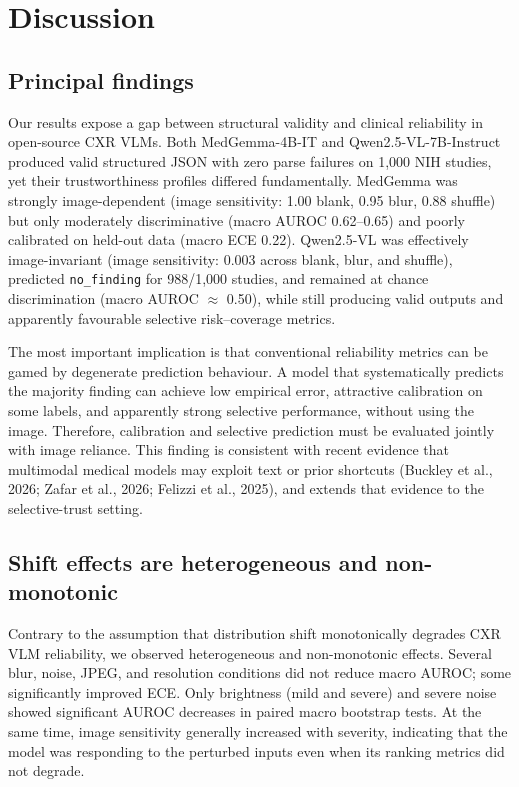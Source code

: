 \section{Discussion}

\subsection{Principal findings}

Our results expose a gap between structural validity and clinical reliability in open-source CXR VLMs. Both MedGemma-4B-IT and Qwen2.5-VL-7B-Instruct produced valid structured JSON with zero parse failures on 1,000 NIH studies, yet their trustworthiness profiles differed fundamentally. MedGemma was strongly image-dependent (image sensitivity: 1.00 blank, 0.95 blur, 0.88 shuffle) but only moderately discriminative (macro AUROC 0.62--0.65) and poorly calibrated on held-out data (macro ECE 0.22). Qwen2.5-VL was effectively image-invariant (image sensitivity: 0.003 across blank, blur, and shuffle), predicted \texttt{no\_finding} for 988/1,000 studies, and remained at chance discrimination (macro AUROC $\approx$ 0.50), while still producing valid outputs and apparently favourable selective risk--coverage metrics.

The most important implication is that conventional reliability metrics can be gamed by degenerate prediction behaviour. A model that systematically predicts the majority finding can achieve low empirical error, attractive calibration on some labels, and apparently strong selective performance, without using the image. Therefore, calibration and selective prediction must be evaluated jointly with image reliance. This finding is consistent with recent evidence that multimodal medical models may exploit text or prior shortcuts (Buckley et al., 2026; Zafar et al., 2026; Felizzi et al., 2025), and extends that evidence to the selective-trust setting.

\subsection{Shift effects are heterogeneous and non-monotonic}

Contrary to the assumption that distribution shift monotonically degrades CXR VLM reliability, we observed heterogeneous and non-monotonic effects. Several blur, noise, JPEG, and resolution conditions did not reduce macro AUROC; some significantly improved ECE. Only brightness (mild and severe) and severe noise showed significant AUROC decreases in paired macro bootstrap tests. At the same time, image sensitivity generally increased with severity, indicating that the model was responding to the perturbed inputs even when its ranking metrics did not degrade.

